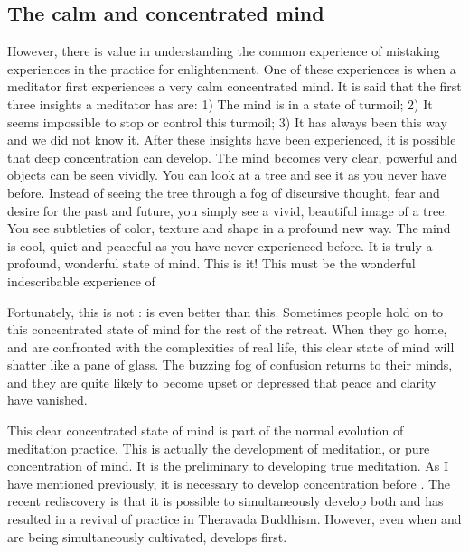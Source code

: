 \documentclass[a5paper,10pt,english]{book}
\begin{document}
\subsection{The calm and concentrated mind}
\label{\detokenize{saints:the-calm-and-concentrated-mind}}
\sphinxAtStartPar
However, there is value in understanding the common experience of
mistaking experiences in the practice for enlightenment. One of these
experiences is when a meditator first experiences a very calm
concentrated mind. It is said that the first three insights a meditator
has are: 1) The mind is in a state of turmoil; 2) It seems impossible to
stop or control this turmoil; 3) It has always been this way and we did
not know it. After these insights have been experienced, it is possible
that deep concentration can develop. The mind becomes very clear,
powerful and objects can be seen vividly. You can look at a tree and see
it as you never have before. Instead of seeing the tree through a fog of
discursive thought, fear and desire for the past and future, you simply
see a vivid, beautiful image of a tree. You see subtleties of color,
texture and shape in a profound new way. The mind is cool, quiet and
peaceful as you have never experienced before. It is truly a profound,
wonderful state of mind. This is it! This must be the wonderful
indescribable experience of 

\sphinxAtStartPar
Fortunately, this is not :  is even better than this.
Sometimes people hold on to this concentrated state of mind for the rest
of the retreat. When they go home, and are confronted with the
complexities of real life, this clear state of mind will shatter like a
pane of glass. The buzzing fog of confusion returns to their minds, and
they are quite likely to become upset or depressed that peace and
clarity have vanished.

\sphinxAtStartPar
This clear concentrated state of mind is part of the normal evolution of
meditation practice. This is actually the development of 
meditation, or pure concentration of mind. It is the preliminary to
developing true  meditation. As I have mentioned
previously, it is necessary to develop concentration before .
The recent rediscovery is that it is possible to simultaneously
develop both  and  has resulted in a revival of
practice in Theravada Buddhism. However, even when  and
 are being simultaneously cultivated,  develops
first.
\end{document}
